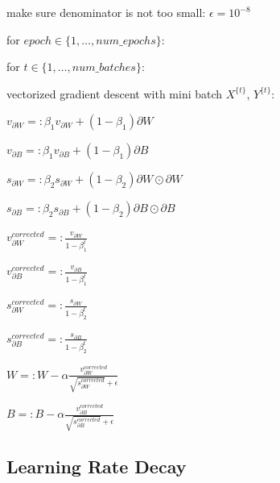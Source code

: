 \documentclass{article}
\begin{document}
\noindent make sure denominator is not too small: \(\epsilon = 10^{-8}\)

\noindent for \(epoch \in \{1, \dots, num\_epochs\}\):

\noindent \hspace{.5cm} for \(t \in \{1, \dots, num\_batches\}\):

\noindent \hspace{1cm} vectorized gradient descent with mini batch \(X^{\{t\}}\), \(Y^{\{t\}}\):

\noindent \hspace{1cm} \(v_{\partial W} =: \beta_{1} v_{\partial W} + (1 - \beta_{1}) \partial W\)

\noindent \hspace{1cm} \(v_{\partial B} =: \beta_{1} v_{\partial B} + (1 - \beta_{1}) \partial B\)

\noindent \hspace{1cm} \(s_{\partial W} =: \beta_{2} s_{\partial W} + (1 - \beta_{2}) \partial W \odot \partial W\)

\noindent \hspace{1cm} \(s_{\partial B} =: \beta_{2} s_{\partial B} + (1 - \beta_{2}) \partial B \odot \partial B\)

\noindent \hspace{1cm} \(v^{corrected}_{\partial W} =: \frac{v_{\partial W}}{1 - \beta^{t}_{1}}\)

\noindent \hspace{1cm} \(v^{corrected}_{\partial B} =: \frac{v_{\partial B}}{1 - \beta^{t}_{1}}\)

\noindent \hspace{1cm} \(s^{corrected}_{\partial W} =: \frac{s_{\partial W}}{1 - \beta^{t}_{2}}\)

\noindent \hspace{1cm} \(s^{corrected}_{\partial B} =: \frac{s_{\partial B}}{1 - \beta^{t}_{2}}\)

\noindent \hspace{1cm} \(W =: W - \alpha \frac{v^{corrected}_{\partial W}}{\sqrt{s^{corrected}_{\partial W}} + \epsilon}\)

\noindent \hspace{1cm} \(B =: B - \alpha \frac{v^{corrected}_{\partial B}}{\sqrt{s^{corrected}_{\partial B}} + \epsilon}\)

\subsection{Learning Rate Decay}
\end{document}
